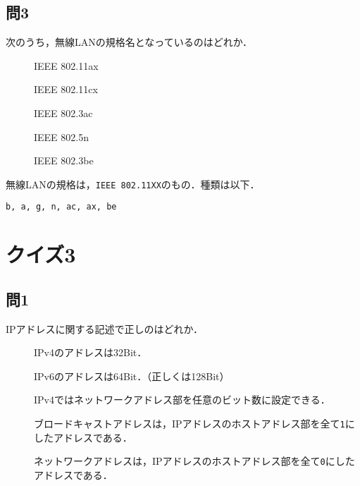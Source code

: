 \documentclass[paper=a4,10pt,twocolumn]{jlreq}
\begin{document}
\subsection*{問3}
次のうち，無線LANの規格名となっているのはどれか．
\begin{description}
    \item[\ci] IEEE 802.11ax
    \item[\bt] IEEE 802.11cx
    \item[\bt] IEEE 802.3ac
    \item[\bt] IEEE 802.5n
    \item[\bt] IEEE 802.3be
\end{description}
無線LANの規格は，\verb|IEEE 802.11XX|のもの．種類は以下．
\begin{center}
    \verb|b, a, g, n, ac, ax, be|
\end{center}
\newpage
\section*{クイズ3}
\subsection*{問1}
IPアドレスに関する記述で正しのはどれか．
\begin{description}
    \item[\ci] IPv4のアドレスは32Bit．
    \item[\bt] IPv6のアドレスは64Bit．（正しくは128Bit）
    \item[\ci] IPv4ではネットワークアドレス部を任意のビット数に設定できる．
    \item[\ci] ブロードキャストアドレスは，IPアドレスのホストアドレス部を全て\verb|1|にしたアドレスである．
    \item[\ci] ネットワークアドレスは，IPアドレスのホストアドレス部を全て\verb|0|にしたアドレスである．
\end{description}
\end{document}
